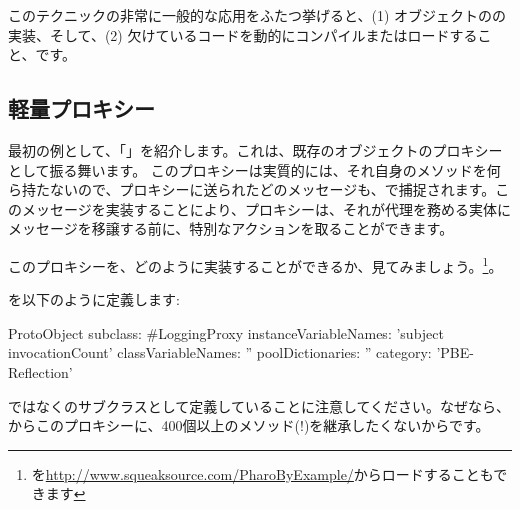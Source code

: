 \documentclass[a4paper,10pt,twoside]{book}
\begin{document}
このテクニックの非常に一般的な応用をふたつ挙げると、(1) オブジェクトのの実装、そして、(2) 欠けているコードを動的にコンパイルまたはロードすること、です。

\subsection{軽量プロキシー}

最初の例として、「」を紹介します。これは、既存のオブジェクトのプロキシーとして振る舞います。
このプロキシーは実質的には、それ自身のメソッドを何ら持たないので、プロキシーに送られたどのメッセージも、で捕捉されます。このメッセージを実装することにより、プロキシーは、それが代理を務める実体にメッセージを移譲する前に、特別なアクションを取ることができます。

このプロキシーを、どのように実装することができるか、見てみましょう。\footnote{を\url{http://www.squeaksource.com/PharoByExample/}からロードすることもできます}。

を以下のように定義します:
\begin{code}{}
ProtoObject subclass: #LoggingProxy
	instanceVariableNames: 'subject invocationCount'
	classVariableNames: ''
	poolDictionaries: ''
	category: 'PBE-Reflection'
\end{code}
ではなくのサブクラスとして定義していることに注意してください。なぜなら、からこのプロキシーに、400個以上のメソッド(!)を継承したくないからです。
\end{document}
